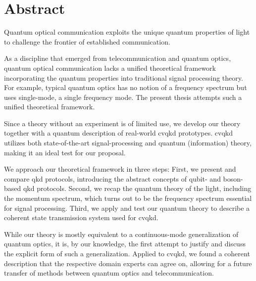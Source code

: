 \section*{Abstract}

Quantum optical communication exploits the unique quantum properties of light to challenge the frontier of established communication.

As a discipline that emerged from telecommunication and quantum optics, quantum optical communication lacks a unified theoretical framework incorporating the quantum properties into traditional signal processing theory.
For example, typical quantum optics has no notion of a frequency spectrum but uses single-mode, a single frequency mode.
The present thesis attempts such a unified theoretical framework.

Since a theory without an experiment is of limited use, we develop our theory together with a quantum description of real-world \gls{cvqkd} prototypes.
\gls{cvqkd} utilizes both state-of-the-art signal-processing and quantum (information) theory, making it an ideal test for our proposal.

We approach our theoretical framework in three steps: First, we present and compare \gls{qkd} protocols, introducing the abstract concepts of qubit- and boson-based {qkd} protocols.
Second, we recap the quantum theory of the light, including the momentum spectrum, which turns out to be the frequency spectrum essential for signal processing.
Third, we apply and test our quantum theory to describe a coherent state transmission system used for \gls{cvqkd}.

While our theory is mostly equivalent to a continuous-mode generalization of quantum optics, it is, by our knowledge, the first attempt to justify and discuss the explicit form of such a generalization.
Applied to \gls{cvqkd}, we found a coherent description that the respective domain experts can agree on, allowing for a future transfer of methods between quantum optics and telecommunication.
